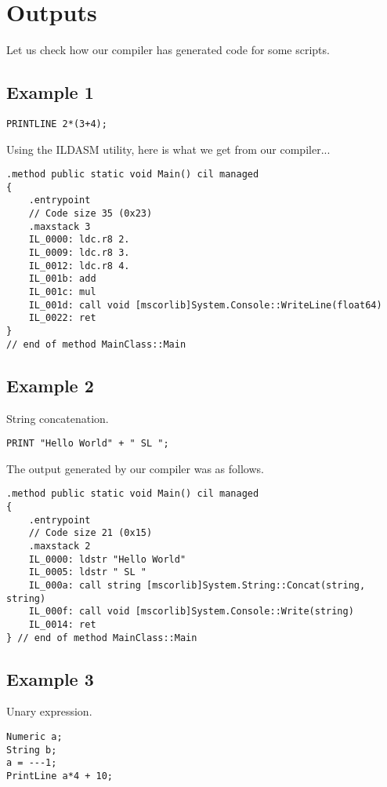 \section{Outputs}
Let us check how our compiler has generated code for some scripts.
\subsection{Example 1}
\lstset{style=csharp}
\begin{lstlisting}
PRINTLINE 2*(3+4);
\end{lstlisting}

Using the ILDASM utility, here is what we get from our compiler...

\lstset{style=csharp}
\begin{lstlisting}
.method public static void Main() cil managed
{
	.entrypoint
	// Code size 35 (0x23)
	.maxstack 3
	IL_0000: ldc.r8 2.
	IL_0009: ldc.r8 3.
	IL_0012: ldc.r8 4.
	IL_001b: add
	IL_001c: mul
	IL_001d: call void [mscorlib]System.Console::WriteLine(float64)
	IL_0022: ret
}
// end of method MainClass::Main
\end{lstlisting}
\subsection{Example 2}
String concatenation.
\lstset{style=csharp}
\begin{lstlisting}
PRINT "Hello World" + " SL ";
\end{lstlisting}

The output generated by our compiler was as follows.

\lstset{style=csharp}
\begin{lstlisting}
.method public static void Main() cil managed
{
	.entrypoint
	// Code size 21 (0x15)
	.maxstack 2
	IL_0000: ldstr "Hello World"
	IL_0005: ldstr " SL "
	IL_000a: call string [mscorlib]System.String::Concat(string, string)
	IL_000f: call void [mscorlib]System.Console::Write(string)
	IL_0014: ret
} // end of method MainClass::Main
\end{lstlisting}

\subsection{Example 3}
Unary expression.
\lstset{style=csharp}
\begin{lstlisting}
Numeric a;
String b;
a = ---1;
PrintLine a*4 + 10;
\end{lstlisting}

